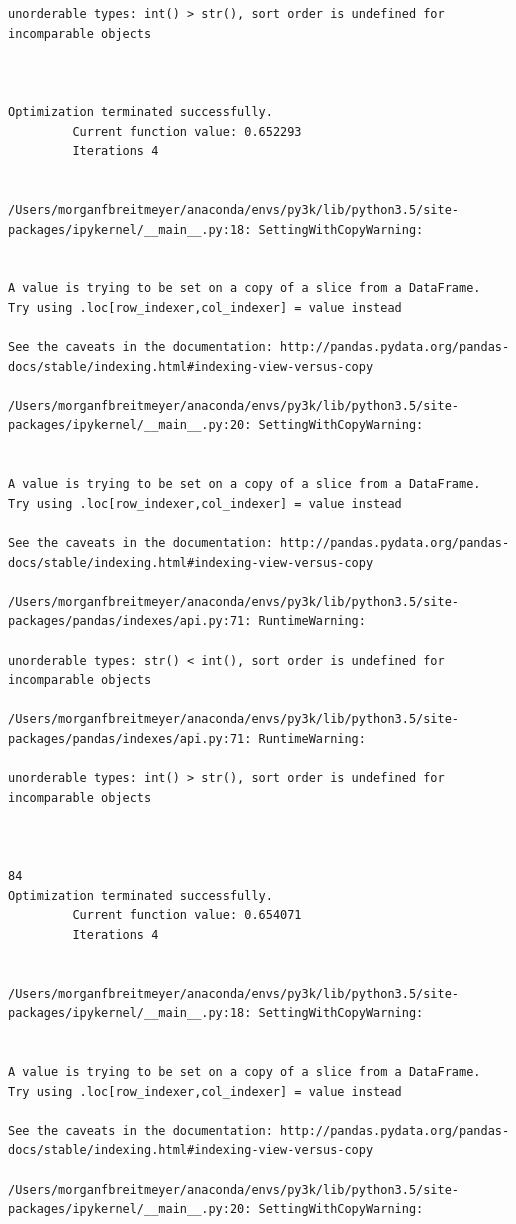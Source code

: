\begin{lstlisting}
unorderable types: int() > str(), sort order is undefined for incomparable objects



Optimization terminated successfully.
         Current function value: 0.652293
         Iterations 4


/Users/morganfbreitmeyer/anaconda/envs/py3k/lib/python3.5/site-packages/ipykernel/__main__.py:18: SettingWithCopyWarning:


A value is trying to be set on a copy of a slice from a DataFrame.
Try using .loc[row_indexer,col_indexer] = value instead

See the caveats in the documentation: http://pandas.pydata.org/pandas-docs/stable/indexing.html#indexing-view-versus-copy

/Users/morganfbreitmeyer/anaconda/envs/py3k/lib/python3.5/site-packages/ipykernel/__main__.py:20: SettingWithCopyWarning:


A value is trying to be set on a copy of a slice from a DataFrame.
Try using .loc[row_indexer,col_indexer] = value instead

See the caveats in the documentation: http://pandas.pydata.org/pandas-docs/stable/indexing.html#indexing-view-versus-copy

/Users/morganfbreitmeyer/anaconda/envs/py3k/lib/python3.5/site-packages/pandas/indexes/api.py:71: RuntimeWarning:

unorderable types: str() < int(), sort order is undefined for incomparable objects

/Users/morganfbreitmeyer/anaconda/envs/py3k/lib/python3.5/site-packages/pandas/indexes/api.py:71: RuntimeWarning:

unorderable types: int() > str(), sort order is undefined for incomparable objects



84
Optimization terminated successfully.
         Current function value: 0.654071
         Iterations 4


/Users/morganfbreitmeyer/anaconda/envs/py3k/lib/python3.5/site-packages/ipykernel/__main__.py:18: SettingWithCopyWarning:


A value is trying to be set on a copy of a slice from a DataFrame.
Try using .loc[row_indexer,col_indexer] = value instead

See the caveats in the documentation: http://pandas.pydata.org/pandas-docs/stable/indexing.html#indexing-view-versus-copy

/Users/morganfbreitmeyer/anaconda/envs/py3k/lib/python3.5/site-packages/ipykernel/__main__.py:20: SettingWithCopyWarning:



\end{lstlisting}
